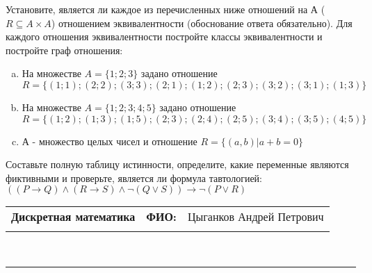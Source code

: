 \documentclass[10pt]{exam}
\newcommand{\class}{Дискретная математика}
\newcommand{\examdate}{}
\begin{document}
\begin{questions}
\question
Установите, является ли каждое из перечисленных ниже отношений на А ($R \subseteq A \times A$) отношением эквивалентности (обоснование ответа обязательно). Для каждого отношения эквивалентности постройте классы 
эквивалентности и постройте граф отношения:
\begin{enumerate} [a)]\setcounter{enumi}{0}
\item На множестве $A = \{1; 2; 3\}$ задано отношение $R = \{(1; 1); (2; 2); (3; 3); (2; 1); (1; 2); (2; 3); (3; 2); (3; 1); (1; 3)\}$
\item На множестве $A = \{1; 2; 3; 4; 5\}$ задано отношение $R = \{(1; 2); (1; 3); (1; 5); (2; 3); (2; 4); (2; 5); (3; 4); (3; 5); (4; 5)\}$
\item А - множество целых чисел и отношение $R = \{(a,b)|a + b = 0\}$
\end{enumerate}\question Составьте полную таблицу истинности, определите, какие переменные являются фиктивными и проверьте, является ли формула тавтологией:
$((P \rightarrow Q) \land (R \rightarrow S) \land \neg (Q \lor S)) \rightarrow \neg (P \lor R)$

\end{questions}
\newpage
\begin{flushright}
\begin{tabular}{p{2.8in} r l}
\textbf{\class} & \textbf{ФИО:} &Цыганков Андрей Петрович
\\

\textbf{\examdate} &&\\
\end{tabular}\\
\end{flushright}
\rule[1ex]{\textwidth}{.1pt}
\end{document}
